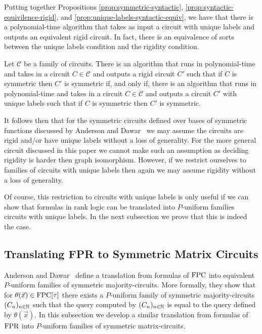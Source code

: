 \documentclass[../paper.tex]{subfiles}
\begin{document}

Putting together Propositions \ref{prop:symmetric-syntactic},
\ref{prop:syntactic-equivilence-rigid}, and
\ref{prop:unique-labels-syntactic-equiv}, we have that there is a
polynomial-time algorithm that takes as input a circuit with unique labels and
outputs an equivalent rigid circuit. In fact, there is an equivalence of sorts
between the unique labels condition and the rigidity condition.

\begin{prop}
  Let $\mathcal{C}$ be a family of circuits. There is an algorithm that runs in
  polynomial-time and takes in a circuit $C \in \mathcal{C}$ and outputs a rigid
  circuit $C'$ such that if $C$ is symmetric then $C'$ is symmetric if, and only
  if, there is an algorithm that runs in polynomial-time and takes in a circuit
  $C \in \mathcal{C}$ and outputs a circuit $C'$ with unique labels such that if
  $C$ is symmetric then $C'$ is symmetric.
\end{prop}

It follows then that for the symmetric circuits defined over bases of symmetric
functions discussed by Anderson and Dawar~\cite{} we may assume the circuits are
rigid and/or have unique labels without a loss of generality. For the more
general circuit discussed in this paper we cannot make such an assumption as
deciding rigidity is harder then graph isomorphism. However, if we restrict
ourselves to families of circuits with unique labels then again we may assume
rigidity without a loss of generality.

Of course, this restriction to circuits with unique labels is only useful if we
can show that formulas in rank logic can be translated into $P$-uniform families
circuits with unique labels. In the next subsection we prove that this is indeed
the case.

\subsection{Translating FPR to Symmetric Matrix Circuits}
Anderson and Dawar~\cite{} define a translation from formulas of $\text{\upshape FPC}$ into
equivalent $P$-uniform families of symmetric majority-circuits. More formally,
they show that for $\theta(\vec{x}) \in \text{\upshape FPC}[\tau]$ there exists a $P$-uniform
family of symmetric majority-circuits $(C_n)_{n \in \mathbb{N}}$ such that the query
computed by $(C_n)_{n \in \mathbb{N}}$ is equal to the query defined by $\theta
(\vec{x})$. In this subsection we develop a similar translation from formulas of
$\text{\upshape FPR}$ into $P$-uniform families of symmetric matrix-circuits.
\end{document}
